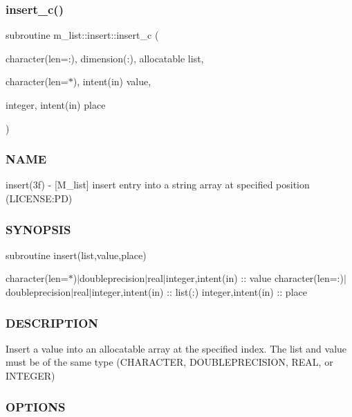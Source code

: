 \subsubsection{\texorpdfstring{insert\+\_\+c()}{insert\_c()}}
{\footnotesize\ttfamily subroutine m\+\_\+list\+::insert\+::insert\+\_\+c (\begin{DoxyParamCaption}\item[{character(len=\+:), dimension(\+:), allocatable}]{list,  }\item[{character(len=$\ast$), intent(in)}]{value,  }\item[{integer, intent(in)}]{place }\end{DoxyParamCaption})\hspace{0.3cm}{\ttfamily [private]}}



\subsubsection*{N\+A\+ME}

insert(3f) -\/ \mbox{[}M\+\_\+list\mbox{]} insert entry into a string array at specified position (L\+I\+C\+E\+N\+SE\+:PD) 

\subsubsection*{S\+Y\+N\+O\+P\+S\+IS}

subroutine insert(list,value,place)

character(len=$\ast$)$\vert$doubleprecision$\vert$real$\vert$integer,intent(in) \+:\+: value character(len=\+:)$\vert$doubleprecision$\vert$real$\vert$integer,intent(in) \+:\+: list(\+:) integer,intent(in) \+:\+: place

\subsubsection*{D\+E\+S\+C\+R\+I\+P\+T\+I\+ON}

\begin{DoxyVerb}Insert a value into an allocatable array at the specified index.
The list and value must be of the same type (CHARACTER, DOUBLEPRECISION,
REAL, or INTEGER)
\end{DoxyVerb}


\subsubsection*{O\+P\+T\+I\+O\+NS}

